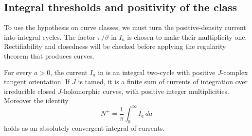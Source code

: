 \subsection{Integral thresholds and positivity of the class}

To use the hypothesis on curve classes, we must turn the
positive-density current into integral cycles. The factor
\(\pi/\vartheta\) in \(I_a\) is chosen to make their multiplicity
one. Rectifiability and closedness will be checked before applying
the regularity theorem that produces curves.

\begin{lemma}\label{lem:density-integral-thresholds}
For every \(a>0\), the current \(I_a\) in
 is an integral two-cycle with
positive \(J\)-complex tangent orientation.  If \(J\) is tamed, it is a
finite sum of currents of integration over irreducible closed
\(J\)-holomorphic curves, with positive integer multiplicities.
Moreover the identity
\begin{equation}\label{eq:density-layer-cake}
 N^+=\frac1\pi\int_0^\infty I_a\,da
\end{equation}
holds as an absolutely convergent integral of currents.
\end{lemma}

